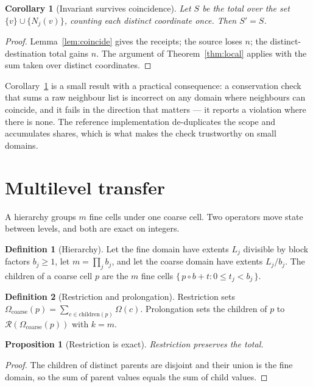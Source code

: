 \documentclass[11pt,a4paper]{article}
\newtheorem{proposition}{Proposition}
\newtheorem{corollary}{Corollary}
\theoremstyle{definition}
\newtheorem{definition}{Definition}
\newcommand{\R}{\mathcal{R}}
\newcommand{\Om}{\Omega}
\begin{document}
\begin{corollary}[Invariant survives coincidence]\label{cor:coincide}
Let $S$ be the total over the \emph{set} $\{v\} \cup \{N_j(v)\}$, counting each
distinct coordinate once. Then $S' = S$.
\end{corollary}
\begin{proof}
Lemma~\ref{lem:coincide} gives the receipts; the source loses $n$; the
distinct-destination total gains $n$. The argument of
Theorem~\ref{thm:local} applies with the sum taken over distinct coordinates.
\end{proof}

Corollary~\ref{cor:coincide} is a small result with a practical consequence: a
conservation check that sums a raw neighbour list is incorrect on any domain
where neighbours can coincide, and it fails in the direction that matters ---
it reports a violation where there is none. The reference implementation
de-duplicates the scope and accumulates shares, which is what makes the check
trustworthy on small domains.

\section{Multilevel transfer}\label{sec:multi}

A hierarchy groups $m$ fine cells under one coarse cell. Two operators move
state between levels, and both are exact on integers.

\begin{definition}[Hierarchy]
Let the fine domain have extents $L_j$ divisible by block factors
$b_j \geq 1$, let $m = \prod_j b_j$, and let the coarse domain have extents
$L_j / b_j$. The children of a coarse cell $p$ are the $m$ fine cells
$\{\,p \circ b + t : 0 \leq t_j < b_j\,\}$.
\end{definition}

\begin{definition}[Restriction and prolongation]
Restriction sets $\Om_{\mathrm{coarse}}(p) = \sum_{c \in \mathrm{children}(p)}
\Om(c)$. Prolongation sets the children of $p$ to $\R(\Om_{\mathrm{coarse}}(p))$
with $k = m$.
\end{definition}

\begin{proposition}[Restriction is exact]
Restriction preserves the total.
\end{proposition}
\begin{proof}
The children of distinct parents are disjoint and their union is the fine
domain, so the sum of parent values equals the sum of child values.
\end{proof}
\end{document}
